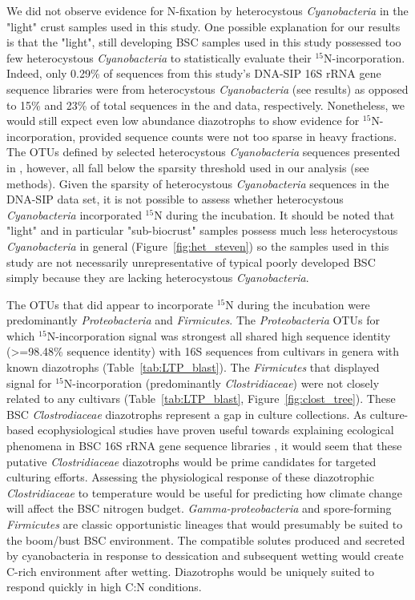 We did not observe evidence for N-fixation by heterocystous
\textit{Cyanobacteria} in the "light" crust samples used in this study. One
possible explanation for our results is that the "light", still developing
BSC samples used in this study possessed too few heterocystous
\textit{Cyanobacteria} to statistically evaluate their $^{15}$N-incorporation.
Indeed, only 0.29\% of sequences from this study's DNA-SIP 16S rRNA gene
sequence libraries were from heterocystous \textit{Cyanobacteria} (see results)
as opposed to 15\% and 23\% of total sequences in the \citet{Steven_2013} and
\citet{Garcia_Pichel_2013} data, respectively.  Nonetheless, we would still
expect even low abundance diazotrophs to show
evidence for $^{15}$N-incorporation, provided sequence counts were not too
sparse in heavy fractions. The OTUs defined by selected heterocystous
\textit{Cyanobacteria} sequences presented in \citet{Yeager}, however, all fall
below the sparsity threshold used in our analysis (see methods). Given the
sparsity of heterocystous \textit{Cyanobacteria} sequences in the DNA-SIP data
set, it is not possible to assess whether heterocystous \textit{Cyanobacteria}
incorporated $^{15}$N during the incubation. It should be noted that "light"
and in particular "sub-biocrust" samples possess much less heterocystous
\textit{Cyanobacteria} in general (Figure~\ref{fig:het_steven}) so the samples
used in this study are not necessarily unrepresentative of typical poorly
developed BSC simply because they are lacking heterocystous
\textit{Cyanobacteria}. 

The OTUs that did appear to incorporate $^{15}$N during the incubation were
predominantly \textit{Proteobacteria} and \textit{Firmicutes}. The
\textit{Proteobacteria} OTUs for which $^{15}$N-incorporation signal was
strongest all shared high sequence identity (\textgreater=98.48\% sequence
identity) with 16S sequences from cultivars in genera with known diazotrophs
(Table~\ref{tab:LTP_blast}). The \textit{Firmicutes} that displayed signal
for $^{15}$N-incorporation (predominantly \textit{Clostridiaceae}) were not
closely related to any cultivars (Table~\ref{tab:LTP_blast},
Figure~\ref{fig:clost_tree}). These BSC \textit{Clostrodiaceae} diazotrophs
represent a gap in culture collections. As culture-based ecophysiological
studies have proven useful towards explaining ecological phenomena in BSC 16S
rRNA gene sequence libraries \citep{Garcia_Pichel_2013}, it would seem that
these putative \textit{Clostridiaceae} diazotrophs would be prime candidates
for targeted culturing efforts. Assessing the physiological response of these
diazotrophic \textit{Clostridiaceae} to temperature would be useful for
predicting how climate change will affect the BSC nitrogen budget.
\textit{Gamma-proteobacteria} and spore-forming \textit{Firmicutes} are classic
opportunistic lineages that would presumably be suited to the boom/bust BSC
environment. The compatible solutes produced and secreted by cyanobacteria in
response to dessication and subsequent wetting would create C-rich
environment after wetting. Diazotrophs would be uniquely suited to respond
quickly in high C:N conditions. 

